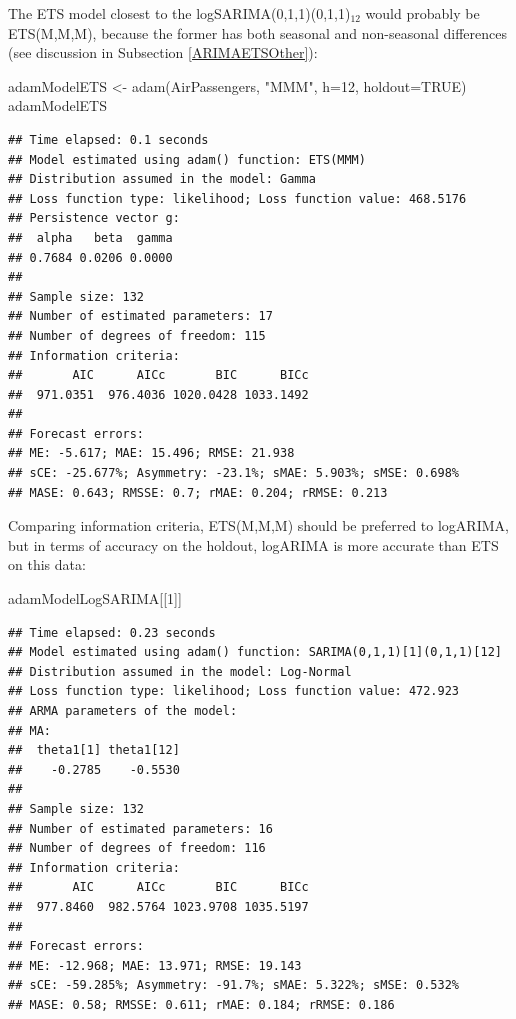 \documentclass[
]{book}
\newenvironment{Shaded}{\begin{snugshade}}{\end{snugshade}}
\newcommand{\AttributeTok}[1]{\textcolor[rgb]{0.77,0.63,0.00}{#1}}
\newcommand{\ConstantTok}[1]{\textcolor[rgb]{0.00,0.00,0.00}{#1}}
\newcommand{\DecValTok}[1]{\textcolor[rgb]{0.00,0.00,0.81}{#1}}
\newcommand{\FunctionTok}[1]{\textcolor[rgb]{0.00,0.00,0.00}{#1}}
\newcommand{\NormalTok}[1]{#1}
\newcommand{\OtherTok}[1]{\textcolor[rgb]{0.56,0.35,0.01}{#1}}
\newcommand{\StringTok}[1]{\textcolor[rgb]{0.31,0.60,0.02}{#1}}
\theoremstyle{definition}
\theoremstyle{definition}
\theoremstyle{definition}
\theoremstyle{definition}
\theoremstyle{remark}
\begin{document}
The ETS model closest to the logSARIMA(0,1,1)(0,1,1)\(_{12}\) would probably be ETS(M,M,M), because the former has both seasonal and non-seasonal differences (see discussion in Subsection \ref{ARIMAETSOther}):

\begin{Shaded}
\begin{Highlighting}[]
\NormalTok{adamModelETS }\OtherTok{\textless{}{-}} \FunctionTok{adam}\NormalTok{(AirPassengers, }\StringTok{"MMM"}\NormalTok{, }\AttributeTok{h=}\DecValTok{12}\NormalTok{, }\AttributeTok{holdout=}\ConstantTok{TRUE}\NormalTok{)}
\NormalTok{adamModelETS}
\end{Highlighting}
\end{Shaded}

\begin{verbatim}
## Time elapsed: 0.1 seconds
## Model estimated using adam() function: ETS(MMM)
## Distribution assumed in the model: Gamma
## Loss function type: likelihood; Loss function value: 468.5176
## Persistence vector g:
##  alpha   beta  gamma 
## 0.7684 0.0206 0.0000 
## 
## Sample size: 132
## Number of estimated parameters: 17
## Number of degrees of freedom: 115
## Information criteria:
##       AIC      AICc       BIC      BICc 
##  971.0351  976.4036 1020.0428 1033.1492 
## 
## Forecast errors:
## ME: -5.617; MAE: 15.496; RMSE: 21.938
## sCE: -25.677%; Asymmetry: -23.1%; sMAE: 5.903%; sMSE: 0.698%
## MASE: 0.643; RMSSE: 0.7; rMAE: 0.204; rRMSE: 0.213
\end{verbatim}

Comparing information criteria, ETS(M,M,M) should be preferred to logARIMA, but in terms of accuracy on the holdout, logARIMA is more accurate than ETS on this data:

\begin{Shaded}
\begin{Highlighting}[]
\NormalTok{adamModelLogSARIMA[[}\DecValTok{1}\NormalTok{]]}
\end{Highlighting}
\end{Shaded}

\begin{verbatim}
## Time elapsed: 0.23 seconds
## Model estimated using adam() function: SARIMA(0,1,1)[1](0,1,1)[12]
## Distribution assumed in the model: Log-Normal
## Loss function type: likelihood; Loss function value: 472.923
## ARMA parameters of the model:
## MA:
##  theta1[1] theta1[12] 
##    -0.2785    -0.5530 
## 
## Sample size: 132
## Number of estimated parameters: 16
## Number of degrees of freedom: 116
## Information criteria:
##       AIC      AICc       BIC      BICc 
##  977.8460  982.5764 1023.9708 1035.5197 
## 
## Forecast errors:
## ME: -12.968; MAE: 13.971; RMSE: 19.143
## sCE: -59.285%; Asymmetry: -91.7%; sMAE: 5.322%; sMSE: 0.532%
## MASE: 0.58; RMSSE: 0.611; rMAE: 0.184; rRMSE: 0.186
\end{verbatim}
\end{document}
